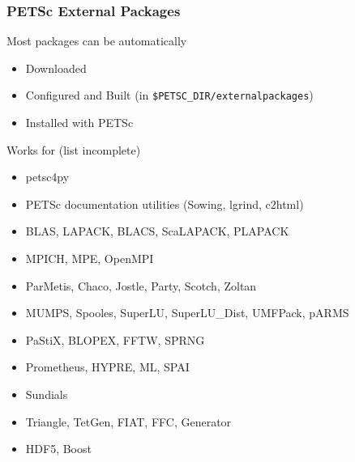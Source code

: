 \begin{frame}[fragile]
\frametitle{PETSc External Packages}

\begin{block}{Most packages can be automatically}
  \begin{itemize}  \vspace*{-0.2cm}
    \item Downloaded
    \item Configured and Built (in \lstinline|$PETSC_DIR/externalpackages|)
    \item Installed with PETSc
  \end{itemize}
\end{block} \vspace*{-0.2cm}
  
\begin{block}{Works for (list incomplete)}
  \begin{itemize}  \vspace*{-0.2cm}
    \item petsc4py
    \item PETSc documentation utilities (Sowing, lgrind, c2html)
    \item BLAS, LAPACK, BLACS, ScaLAPACK, PLAPACK
    \item MPICH, MPE, OpenMPI
    \item ParMetis, Chaco, Jostle, Party, Scotch, Zoltan
    \item MUMPS, Spooles, SuperLU, SuperLU\_Dist, UMFPack, pARMS
    \item PaStiX, BLOPEX, FFTW, SPRNG
    \item Prometheus, HYPRE, ML, SPAI
    \item Sundials
    \item Triangle, TetGen, FIAT, FFC, Generator
    \item HDF5, Boost
  \end{itemize}
\end{block}

\end{frame}
